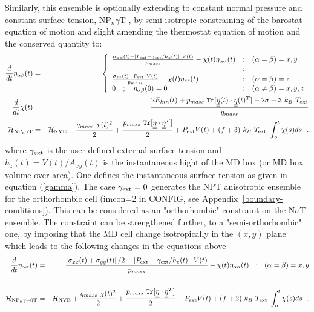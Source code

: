 Similarly, this ensemble is optionally extending to constant
normal pressure and constant surface tension, NP$_{n}\gamma$T
\cite{ikeguchi-04a}, by semi-isotropic constraining of the
barostat equation of motion and slight amending the thermostat
equation of motion and the conserved quantity to:
\begin{eqnarray}
\frac{d}{dt} \eta_{\alpha\beta}(t) &=& \left\{ \begin{array} {l@{\quad:\quad}l}
\frac{\sigma_{\alpha\alpha}(t) - \left[ P_{\rm ext} - \gamma_{\rm ext} / h_{z}(t) \right]~V(t)}{p_{mass}} -
\chi(t) \eta_{\alpha\alpha}(t) & (\alpha = \beta) = x,y \\
& \\
\frac{\sigma_{zz}(t) - P_{\rm ext}~V(t)}{p_{mass}} -
\chi(t) \eta_{zz}(t) & (\alpha = \beta) = z \\
0~~~;~~~\eta_{\alpha\beta}(0) = 0 & (\alpha \ne \beta) = x,y,z
\end{array} \right. \nonumber \\
\frac{d}{dt} \chi(t) &=& \frac{2 E_{kin}(t) + p_{mass}~{\tt Tr}[\mat{\eta}(t) \cdot
\mat{\eta}(t)^{T}] - 2 \sigma - 3~k_{B}~T_{\rm ext}}{q_{mass}} \\
{\cal H}_{\rm NP_{n}\gamma T} &=& {\cal H}_{\rm NVE} + {q_{mass}~\chi (t)^{2} \over 2} +
{p_{mass}~{\tt Tr}[\mat{\eta} \cdot \mat{\eta}^{T}] \over 2} + P_{\rm ext} V(t) +
(f+3)~k_{B}~T_{\rm ext}~\int_o^t \chi (s) ds~~. \nonumber
\end{eqnarray}
where $\gamma_{\rm ext}$ is the user defined external surface tension
and $h_{z}(t) = V(t) / A_{xy}(t)$ is the instantaneous hight of the
MD box (or MD box volume over area).  One defines the instantaneous surface
tension as given in equation (\ref{gamma}).  The case $\gamma_{\rm ext}=0$
generates the NPT anisotropic ensemble for the orthorhombic cell
(imcon=2 in CONFIG, see Appendix~\ref{boundary-conditions}).  This
can be considered as an "orthorhombic" constraint on the N$\sigma$T ensemble.
The constraint can be strengthened further, to a "semi-orthorhombic" one, by
imposing that the MD cell change isotropically in the $(x,y)$ plane which
leads to the following changes in the equations above
\begin{eqnarray}
\frac{d}{dt} \eta_{\alpha\alpha}(t) &=& \frac{\left[\sigma_{xx}(t)+\sigma_{yy}(t)\right]/2 -
\left[ P_{\rm ext} - \gamma_{\rm ext} / h_{z}(t) \right]~V(t)}{p_{mass}} -
\chi (t) \eta_{\alpha\alpha}(t)~~:~~(\alpha = \beta) = x,y \nonumber \\
 & & \\
{\cal H}_{\rm NP_{n}{\gamma}{=0}T} &=& {\cal H}_{\rm NVE} + {q_{mass}~\chi (t)^{2} \over 2} +
{p_{mass}~{\tt Tr}[\mbox{$\underline{\underline{\bf \eta}}$} \cdot \mbox{$\underline{\underline{\bf \eta}}$}^{T}] \over 2} + P_{\rm ext} V(t) +
(f+2)~k_{B}~T_{\rm ext}~\int_o^t \chi (s) ds~~.\nonumber
\end{eqnarray}

